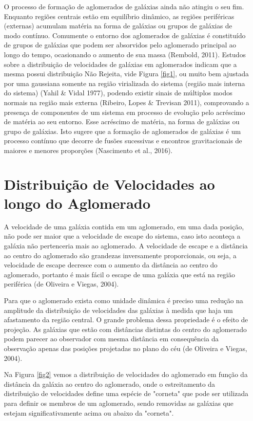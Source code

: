 O processo de formação de aglomerados de galáxias ainda não atingiu o seu fim. Enquanto regiões centrais estão em equilíbrio dinâmico, as regiões periféricas (externas) acumulam matéria na forma de galáxias ou grupos de galáxias de modo contínuo. Comumente o entorno dos aglomerados de galáxias é constituído de grupos de galáxias que podem ser absorvidos pelo aglomerado principal ao longo do tempo, ocasionando o aumento de sua massa (Rembold, 2011). Estudos sobre a distribuição de velocidades de galáxias em aglomerados indicam que a mesma possui distribuição Não Rejeita, vide Figura \ref{fig1}, ou muito bem ajustada por uma gaussiana somente na região virializada do sistema (região mais interna do sistema) (Yahil \& Vidal 1977), podendo existir sinais de múltiplos modos normais na região mais externa (Ribeiro, Lopes \& Trevisan 2011), comprovando a presença de componentes de um sistema em processo de evolução pelo acréscimo de matéria ao seu entorno. Esse acréscimo de matéria, na forma de galáxias ou grupo de galáxias.  Isto sugere que a formação de aglomerados de galáxias é um processo contínuo que decorre de fusões sucessivas e encontros gravitacionais de maiores e menores proporções (Nascimento et al., 2016).



\section{Distribuição de Velocidades ao longo do Aglomerado}
A velocidade de uma galáxia contida em um aglomerado, em uma dada posição, não pode ser maior que a velocidade de escape do sistema, caso isto aconteça a galáxia não pertenceria mais ao aglomerado. A velocidade de escape e a distância ao centro do aglomerado são grandezas inversamente proporcionais, ou seja, a velocidade de escape decresce com o aumento da distância ao centro do aglomerado, portanto é mais fácil o escape de uma galáxia que está na região periférica (de Oliveira e Viegas, 2004).

Para que o aglomerado exista como unidade dinâmica é preciso uma redução na amplitude da distribuição de velocidades das galáxias à medida que haja um afastamento da região central. O grande problema dessa propriedade é o efeito de projeção. As galáxias que estão com distâncias distintas do centro do aglomerado podem parecer ao observador com mesma distância em consequência da observação apenas das posições projetadas no plano do céu (de Oliveira e Viegas, 2004).

Na Figura \ref{fig2} vemos a distribuição de velocidades do aglomerado em função da distância da galáxia ao centro do aglomerado, onde o estreitamento da distribuição de velocidades define uma espécie de "corneta" que pode ser utilizada para definir os membros de um aglomerado, sendo removidas as galáxias que estejam significativamente acima ou abaixo da "corneta".


